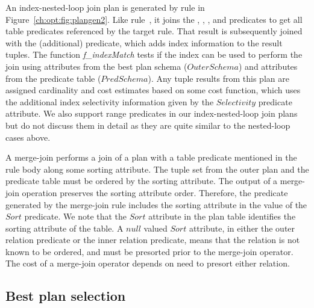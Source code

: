 An index-nested-loop join plan is generated by rule  in
Figure~\ref{ch:opt:fig:plangen2}.  Like rule~, it joins the
, , , and  predicates to
get all table predicates referenced by the target rule.  That result is
subsequently joined with the (additional)  predicate, which adds
index information to the result tuples.  The function {\em f\_indexMatch} tests
if the index can be used to perform the join using attributes from the best
plan schema ($OuterSchema$) and attributes from the predicate table
($PredSchema$).  Any tuple results from this plan are assigned cardinality and
cost estimates based on some cost function, which uses the additional index
selectivity information given by the $Selectivity$  predicate
attribute.  We also support range predicates in our index-nested-loop join
plans but do not discuss them in detail as they are quite similar to the
nested-loop cases above.

A merge-join performs a join of a plan with a table predicate mentioned in the
rule body along some sorting attribute.  The tuple set from the outer plan and
the predicate table must be ordered by the sorting attribute.  The output of a
merge-join operation preserves the sorting attribute order.  Therefore, the
 predicate generated by the merge-join rule includes the sorting
attribute in the value of the $Sort$  predicate.  We note that the
$Sort$ attribute in the  plan table identifies the sorting attribute
of the table.  A $null$ valued $Sort$ attribute, in either the outer relation
 predicate or the inner relation  predicate, means that the
relation is not known to be ordered, and must be presorted prior to the
merge-join operator.  The cost of a merge-join operator depends on need to
presort either relation.

\subsection{Best plan selection}
\label{ch:opt:sec:bestplan}

